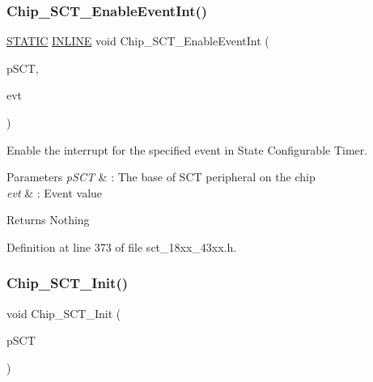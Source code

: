 \subsubsection{\texorpdfstring{Chip\+\_\+\+S\+C\+T\+\_\+\+Enable\+Event\+Int()}{Chip\_SCT\_EnableEventInt()}}
{\footnotesize\ttfamily \hyperlink{group___l_p_c___types___public___macros_ga10b2d890d871e1489bb02b7e70d9bdfb}{S\+T\+A\+T\+IC} \hyperlink{spifi__18xx__43xx_8h_a2eb6f9e0395b47b8d5e3eeae4fe0c116}{I\+N\+L\+I\+NE} void Chip\+\_\+\+S\+C\+T\+\_\+\+Enable\+Event\+Int (\begin{DoxyParamCaption}\item[{\hyperlink{struct_l_p_c___s_c_t___t}{L\+P\+C\+\_\+\+S\+C\+T\+\_\+T} $\ast$}]{p\+S\+CT,  }\item[{\hyperlink{group___s_c_t__18_x_x__43_x_x_ga9c76365e19f53e676f05cb7ccec143f7}{C\+H\+I\+P\+\_\+\+S\+C\+T\+\_\+\+E\+V\+E\+N\+T\+\_\+T}}]{evt }\end{DoxyParamCaption})}



Enable the interrupt for the specified event in State Configurable Timer. 


\begin{DoxyParams}{Parameters}
{\em p\+S\+CT} & \+: The base of S\+CT peripheral on the chip \\
\hline
{\em evt} & \+: Event value \\
\hline
\end{DoxyParams}
\begin{DoxyReturn}{Returns}
Nothing 
\end{DoxyReturn}


Definition at line 373 of file sct\+\_\+18xx\+\_\+43xx.\+h.

\mbox{\label{group___s_c_t__18_x_x__43_x_x_ga5252a235f465943fb91cdf66e4dac3cf}} 
\subsubsection{\texorpdfstring{Chip\+\_\+\+S\+C\+T\+\_\+\+Init()}{Chip\_SCT\_Init()}}
{\footnotesize\ttfamily void Chip\+\_\+\+S\+C\+T\+\_\+\+Init (\begin{DoxyParamCaption}\item[{\hyperlink{struct_l_p_c___s_c_t___t}{L\+P\+C\+\_\+\+S\+C\+T\+\_\+T} $\ast$}]{p\+S\+CT }\end{DoxyParamCaption})}



